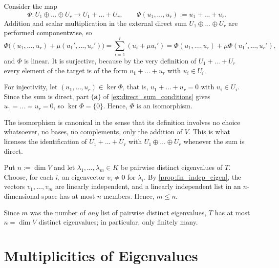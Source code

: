 \begin{exercisesolution}
\label{sol:canonical_iso_direct_sum}
  Consider the map
  \[ \Phi : U_1 \oplus \dots \oplus U_r \longrightarrow U_1 + \dots + U_r, \qquad \Phi(u_1, \dots, u_r) := u_1 + \dots + u_r. \]
  Addition and scalar multiplication in the external direct sum $U_1 \oplus \dots \oplus U_r$ are performed componentwise, so
  \[ \Phi\big((u_1, \dots, u_r) + \mu (u_1', \dots, u_r')\big) = \sum_{i=1}^r (u_i + \mu u_i') = \Phi(u_1, \dots, u_r) + \mu \Phi(u_1', \dots, u_r'), \]
  and $\Phi$ is linear. It is surjective, because by the very definition of $U_1 + \dots + U_r$ every element of the target is of the form $u_1 + \dots + u_r$ with $u_i \in U_i$.

  For injectivity, let $(u_1, \dots, u_r) \in \ker \Phi$, that is, $u_1 + \dots + u_r = 0$ with $u_i \in U_i$. Since the sum is direct, part \textbf{(a)} of \cref{ex:direct_sum_conditions} gives $u_1 = \dots = u_r = 0$, so $\ker \Phi = \{0\}$. Hence, $\Phi$ is an isomorphism.

  The isomorphism is canonical in the sense that its definition involves no choice whatsoever, no bases, no complements, only the addition of $V$. This is what licenses the identification of $U_1 + \dots + U_r$ with $U_1 \oplus \dots \oplus U_r$ whenever the sum is direct.
\end{exercisesolution}

\begin{exercisesolution}
\label{sol:finite_eigenvalues}
  Put $n := \dim V$ and let $\lambda_1, \dots, \lambda_m \in K$ be pairwise distinct eigenvalues of $T$. Choose, for each $i$, an eigenvector $v_i \ne 0$ for $\lambda_i$. By \cref{prop:lin_indep_eigen}, the vectors $v_1, \dots, v_m$ are linearly independent, and a linearly independent list in an $n$-di\-men\-sional space has at most $n$ members. Hence, $m \le n$.

  Since $m$ was the number of \emph{any} list of pairwise distinct eigenvalues, $T$ has at most $n = \dim V$ distinct eigenvalues; in particular, only finitely many.
\end{exercisesolution}

\renewcommand{\thetheorem}{21.b.\arabic{theorem}}
\setcounter{theorem}{0}
\section{Multiplicities of Eigenvalues}

